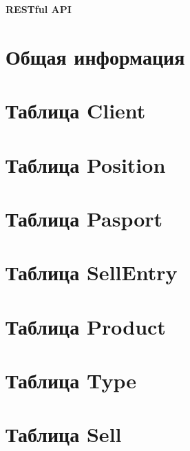 \documentclass[14pt,a4paper,report]{report}
\begin{document}
\begin{titlepage}
\vspace*{\fill}
    \begin{center}
      \textbf{\Huge RESTful API}

    \end{center}
    \vspace*{\fill}
\end{titlepage}

\setcounter{page}{2}

\def\contentsname{Содержание}
\tableofcontents \label{toc}
\clearpage



\part{Общая информация}



\part{Таблица Client}



\part{Таблица Position}



\part{Таблица Pasport}



\part{Таблица SellEntry}


\part{Таблица Product}



\part{Таблица Type}



\part{Таблица Sell}

\end{document}
